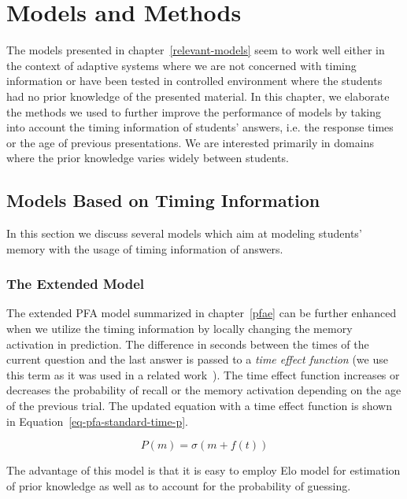 \chapter{Models and Methods}

The models presented in chapter~\ref{relevant-models} seem to work well either in the context of adaptive systems where we are not concerned with timing information or have been tested in controlled environment where the students had no prior knowledge of the presented material. In this chapter, we elaborate the methods we used to further improve the performance of models by taking into account the timing information of students' answers, i.e. the response times or the age of previous presentations. We are interested primarily in domains where the prior knowledge varies widely between students.

\section{Models Based on Timing Information}
\label{models-timing}

In this section we discuss several models which aim at modeling students' memory with the usage of timing information of answers.

\subsection{The Extended Model}
\label{pfaet}

The extended PFA model summarized in chapter~\ref{pfae} can be further enhanced when we utilize the timing information by locally changing the memory activation in prediction. The difference in seconds between the times of the current question and the last answer is passed to a \textit{time effect function} (we use this term as it was used in a related work~\cite{Pelanek2015}). The time effect function increases or decreases the probability of recall or the memory activation depending on the age of the previous trial. The updated equation with a time effect function is shown in Equation~\ref{eq-pfa-standard-time-p}.

\begin{equation} \label{eq-pfa-standard-time-p}
  P(m) = \sigma(m + f(t))
\end{equation}

The advantage of this model is that it is easy to employ Elo model for estimation of prior knowledge as well as to account for the probability of guessing.

